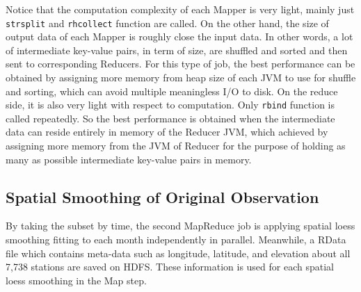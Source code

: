 Notice that the computation complexity of each Mapper is very light, mainly just
\texttt{strsplit} and \texttt{rhcollect} function are called. On the other hand,
the size of output data of each Mapper is roughly close the input data. In other
words, a lot of intermediate key-value pairs, in term of size, are shuffled and
sorted and then sent to corresponding Reducers. For this type of job, the best 
performance can be obtained by assigning more memory from heap size of each JVM 
to use for shuffle and sorting, which can avoid multiple meaningless I/O to disk.  
On the reduce side, it is also very light with respect to computation. Only 
\texttt{rbind} function is called repeatedly. So the best performance is obtained 
when the intermediate data can reside entirely in memory of the Reducer JVM, 
which achieved by assigning more memory from the JVM of Reducer for the purpose
of holding as many as possible intermediate key-value pairs in memory. 

\subsection{Spatial Smoothing of Original Observation}
\label{sec:spaofit}
By taking the subset by time, the second 
MapReduce job is applying spatial loess smoothing fitting to each month 
independently in parallel. Meanwhile, a RData file which contains meta-data such
as longitude, latitude, and elevation about all 7,738 stations are saved on HDFS.
These information is used for each spatial loess smoothing in the Map step. 

